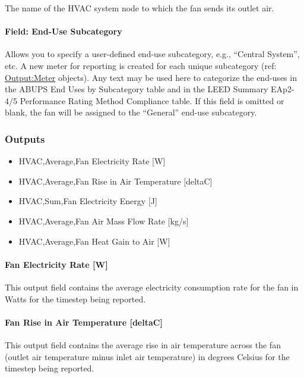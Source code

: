 The name of the HVAC system node to which the fan sends its outlet air.

\paragraph{Field: End-Use Subcategory}\label{field-end-use-subcategory-001}

Allows you to specify a user-defined end-use subcategory, e.g., ``Central System'', etc. A new meter for reporting is created for each unique subcategory (ref: \hyperref[outputmeter-and-outputmetermeterfileonly]{Output:Meter} objects). Any text may be used here to categorize the end-uses in the ABUPS End Uses by Subcategory table and in the LEED Summary EAp2-4/5 Performance Rating Method Compliance table. If this field is omitted or blank, the fan will be assigned to the ``General'' end-use subcategory.

\subsubsection{Outputs}\label{outputs-013}

\begin{itemize}
\item
  HVAC,Average,Fan Electricity Rate {[}W{]}
\item
  HVAC,Average,Fan Rise in Air Temperature {[}deltaC{]}
\item
  HVAC,Sum,Fan Electricity Energy {[}J{]}
\item
  HVAC,Average,Fan Air Mass Flow Rate {[}kg/s{]}
\item
  HVAC,Average,Fan Heat Gain to Air {[}W{]}
\end{itemize}

\paragraph{Fan Electricity Rate {[}W{]}}\label{fan-electric-power-w}

This output field contains the average electricity consumption rate for the fan in Watts for the timestep being reported.

\paragraph{Fan Rise in Air Temperature {[}deltaC{]}}\label{fan-rise-in-air-temperature-deltac}

This output field contains the average rise in air temperature across the fan (outlet air temperature minus inlet air temperature) in degrees Celsius for the timestep being reported.

